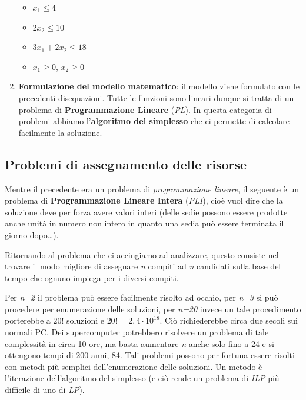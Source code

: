 \documentclass[11pt]{book}
\begin{document}
\begin{enumerate}
  \begin{itemize}
  \item $x_1\leq 4$
  \item $2x_2 \leq 10$
  \item $3x_1 + 2x_2 \leq 18$
  \item $x_1 \geq 0$, $x_2 \geq 0$
  \end{itemize}

\item {\bf Formulazione del modello matematico}: il modello viene
  formulato con le precedenti disequazioni. Tutte le funzioni sono
  lineari dunque si tratta di un problema di {\bf Programmazione
    Lineare} ({\em PL}). In questa categoria di problemi abbiamo
  l'{\bf algoritmo del simplesso} che ci permette di calcolare
  facilmente la soluzione.

\end{enumerate}


\subsection{Problemi di assegnamento delle risorse}

Mentre il precedente era un problema di {\em programmazione lineare},
il seguente \`e un problema di {\bf Programmazione Lineare Intera}
({\em PLI}), cio\`e vuol dire che la soluzione deve per forza avere
valori interi (delle sedie possono essere prodotte anche unit\`a in
numero non intero in quanto una sedia pu\`o essere terminata il giorno
dopo\dots).

Ritornando al problema che ci accingiamo ad analizzare, questo
consiste nel trovare il modo migliore di assegnare {\em n} compiti ad
{\em n} candidati sulla base del tempo che ognuno impiega per i
diversi compiti. 

Per {\em n=2} il problema pu\`o essere facilmente risolto ad occhio,
per {\em n=3} si pu\`o procedere per enumerazione delle soluzioni, per
{\em n=20} invece un tale procedimento porterebbe a $20!$ soluzioni e
$20! = 2,4 \cdot 10^{18}$. Ci\`o richiederebbe circa due secoli sui
normali PC. Dei supercomputer potrebbero risolvere un problema di tale
complessit\`a in circa 10 ore, ma basta aumentare {\em n} anche solo
fino a 24 e si ottengono tempi di 200 anni, 84. Tali problemi possono
per fortuna essere risolti con metodi pi\`u semplici dell'enumerazione
delle soluzioni. Un metodo \`e l'iterazione dell'algoritmo del
simplesso (e ci\`o rende un problema di {\em ILP} pi\`u difficile di
uno di {\em LP}).
\end{document}
